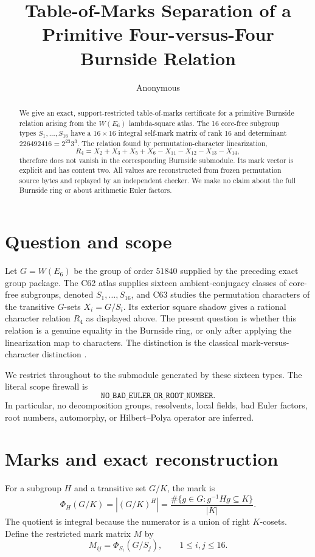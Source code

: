 \documentclass[10pt]{article}
\title{Table-of-Marks Separation of a Primitive Four-versus-Four Burnside Relation}
\author{Anonymous}
\date{}
\newcommand{\W}{W(E_6)}
\begin{document}
\maketitle

\begin{abstract}
We give an exact, support-restricted table-of-marks certificate for a
primitive Burnside relation arising from the $W(E_6)$ lambda-square atlas.
The 16 core-free subgroup types $S_1,\ldots,S_{16}$ have a $16\times16$
integral self-mark matrix of rank 16 and determinant
$226492416=2^{23}3^3$.  The relation found by permutation-character
linearization,
\[
R_4=X_2+X_3+X_5+X_6-X_{11}-X_{12}-X_{13}-X_{14},
\]
therefore does not vanish in the corresponding Burnside submodule.  Its mark
vector is explicit and has content two.
All values are reconstructed from frozen permutation source bytes and replayed
by an independent checker.  We make no claim about the full Burnside ring or
about arithmetic Euler factors.
\end{abstract}

\section{Question and scope}
Let $G=\W$ be the group of order $51840$ supplied by the preceding exact
group package.  The C62 atlas supplies sixteen ambient-conjugacy classes of
core-free subgroups, denoted $S_1,\ldots,S_{16}$, and C63 studies the
permutation characters of the transitive $G$-sets $X_i=G/S_i$.  Its exterior
square shadow gives a rational character relation $R_4$ as displayed above.
The present question is whether this relation is a genuine equality in the
Burnside ring, or only after applying the linearization map to characters.
The distinction is the classical mark-versus-character distinction
\cite{dress1991marks,serre1977linear,gassmann1926bemerkungen}.

We restrict throughout to the submodule generated by these sixteen types.  The
literal scope firewall is
\[
\texttt{NO\_BAD\_EULER\_OR\_ROOT\_NUMBER}.
\]
In particular, no decomposition groups, resolvents, local fields, bad Euler
factors, root numbers, automorphy, or Hilbert--Polya operator are inferred.

\section{Marks and exact reconstruction}
For a subgroup $H$ and a transitive set $G/K$, the mark is
\[
\Phi_H(G/K)=|(G/K)^H|
 =\frac{\#\{g\in G:g^{-1}Hg\subseteq K\}}{|K|}.
\]
The quotient is integral because the numerator is a union of right $K$-cosets.
Define the restricted mark matrix $M$ by
\[
 M_{ij}=\Phi_{S_i}(G/S_j), \qquad 1\leq i,j\leq16.
\]
\end{document}

